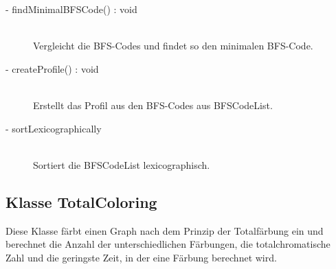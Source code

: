 \documentclass[13pt]{scrreprt}
\begin{document}
\begin{itemize}[label = {$\circ$}]
\begin{description}
			\item [- findMinimalBFSCode() : void] \hfill \\Vergleicht die BFS-Codes und findet so den minimalen BFS-Code.
			\item [- createProfile() : void] \hfill \\Erstellt das Profil aus den BFS-Codes aus BFSCodeList.
			\item[- sortLexicographically] \hfill \\ Sortiert die BFSCodeList lexicographisch.
		\end{description}
	\end{itemize}
	
	
	\subsection{Klasse TotalColoring}
	
	Diese Klasse färbt einen Graph nach dem Prinzip der Totalfärbung ein und berechnet die Anzahl der unterschiedlichen Färbungen, die totalchromatische Zahl und die geringste Zeit, in der eine Färbung berechnet wird.
	
\end{document}
